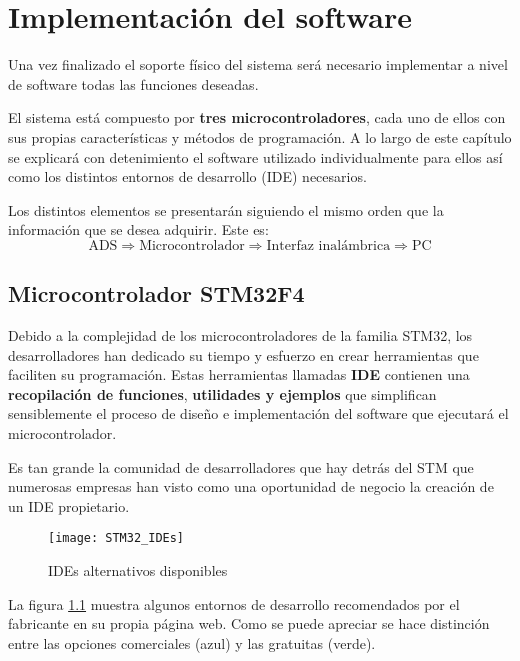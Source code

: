 \chapter{Implementación del software\label{sec:Implementacion_soft}}

Una vez finalizado el soporte físico del sistema será necesario implementar a nivel de software todas las funciones deseadas.

El sistema está compuesto por \textbf{tres microcontroladores}, cada uno de ellos con sus propias características y métodos de programación. A lo largo de este capítulo se explicará con detenimiento el software utilizado individualmente para ellos así como los distintos entornos de desarrollo (\acrshort{IDE}) necesarios.

Los distintos elementos se presentarán siguiendo el mismo orden que la información que se desea adquirir. Este es:
\textbf{$$\text{ADS} \Rightarrow \text{Microcontrolador} \Rightarrow \text{Interfaz inalámbrica} \Rightarrow \text{PC}$$}

\section{Microcontrolador STM32F4\label{sec:Software_micro}}

Debido a la complejidad de los microcontroladores de la familia STM32, los desarrolladores han dedicado su tiempo y esfuerzo en crear herramientas que faciliten su programación. Estas herramientas llamadas \textbf{\acrshort{IDE}} contienen una \textbf{recopilación de funciones}, \textbf{utilidades y ejemplos} que simplifican sensiblemente el proceso de diseño e implementación del software que ejecutará el microcontrolador.

Es tan grande la comunidad de desarrolladores que hay detrás del STM que numerosas empresas han visto como una oportunidad de negocio la creación de un \acrshort{IDE} propietario.

\clearpage

\begin{figure} [h]
    \centering
    \texttt{[image: STM32\_IDEs]}
    \caption{IDEs alternativos disponibles \cite{STM32_IDEs}}
    \label{fig:STM32_IDEs}
\end{figure}

La figura \ref{fig:STM32_IDEs} muestra algunos entornos de desarrollo recomendados por el fabricante en su propia página web. Como se puede apreciar se hace distinción entre las opciones comerciales (azul) y las gratuitas (verde).

